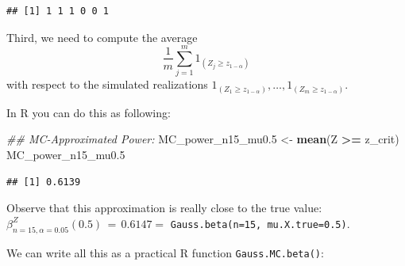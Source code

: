 \documentclass[]{book}
\newenvironment{Shaded}{\begin{snugshade}}{\end{snugshade}}
\newcommand{\CommentTok}[1]{\textcolor[rgb]{0.56,0.35,0.01}{\textit{#1}}}
\newcommand{\FloatTok}[1]{\textcolor[rgb]{0.00,0.00,0.81}{#1}}
\newcommand{\KeywordTok}[1]{\textcolor[rgb]{0.13,0.29,0.53}{\textbf{#1}}}
\newcommand{\NormalTok}[1]{#1}
\newcommand{\OperatorTok}[1]{\textcolor[rgb]{0.81,0.36,0.00}{\textbf{#1}}}
\newcommand{\StringTok}[1]{\textcolor[rgb]{0.31,0.60,0.02}{#1}}
\theoremstyle{definition}
\theoremstyle{definition}
\theoremstyle{definition}
\theoremstyle{remark}
\begin{document}
\begin{verbatim}
## [1] 1 1 1 0 0 1
\end{verbatim}

Third, we need to compute the average
\[
\frac{1}{m}\sum_{j=1}^m 1_{(Z_j \geq z_{1-\alpha})}
\]
with respect to the simulated realizations \(1_{(Z_1 \geq z_{1-\alpha})},\dots,1_{(Z_m \geq z_{1-\alpha})}\).

In R you can do this as following:

\begin{Shaded}
\begin{Highlighting}[]
\CommentTok{## MC-Approximated Power:}
\NormalTok{MC_power_n15_mu0}\FloatTok{.5}\NormalTok{ <-}\StringTok{ }\KeywordTok{mean}\NormalTok{(Z }\OperatorTok{>=}\StringTok{ }\NormalTok{z_crit)}
\NormalTok{MC_power_n15_mu0}\FloatTok{.5}
\end{Highlighting}
\end{Shaded}

\begin{verbatim}
## [1] 0.6139
\end{verbatim}

Observe that this approximation is really close to the true value:
~
\(\beta^{Z}_{n=15,\alpha=0.05}(0.5)\,=\,0.6147 =\) \texttt{Gauss.beta(n=15,\ mu.X.true=0.5)}.

We can write all this as a practical R function \texttt{Gauss.MC.beta()}:
\end{document}
